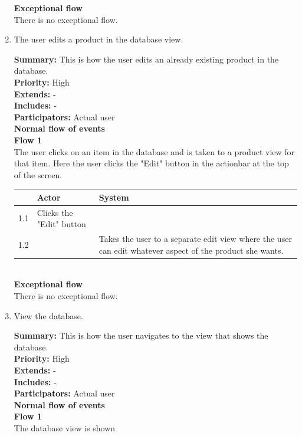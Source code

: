 \documentclass{report}
\begin{document}
\begin{enumerate}
    \textbf{Exceptional flow} \\ There is no exceptional flow.

\pagebreak

  \item The user edits a product in the database view. \

    \textbf{Summary:} This is how the user edits an already existing product in the database. \\
    \textbf{Priority:} High \\
    \textbf{Extends:} - \\
    \textbf{Includes:} - \\
    \textbf{Participators:} Actual user \\
    \textbf{Normal flow of events} \\
    \textbf{Flow 1} \\ The user clicks on an item in the database and is taken to a product view for that item. Here the user clicks the "Edit" button in the actionbar at the top of the screen. \\

    \begin{tabular}{ | l | p{4cm} | p{4cm} |}
    \hline
      & Actor & System \\ \hline
    1.1 & Clicks the "Edit" button & \\ \hline
    1.2 & & Takes the user to a separate edit view where the user can edit whatever aspect of the product she wants. \\
    \hline
    \end{tabular} \\

    \textbf{Exceptional flow} \\ There is no exceptional flow.

\pagebreak

  \item View the database. \

    \textbf{Summary:} This is how the user navigates to the view that shows the database. \\
    \textbf{Priority:} High \\
    \textbf{Extends:} - \\
    \textbf{Includes:} - \\
    \textbf{Participators:} Actual user \\
    \textbf{Normal flow of events} \\
    \textbf{Flow 1} \\ The database view is shown \\


\end{enumerate}
\end{document}
